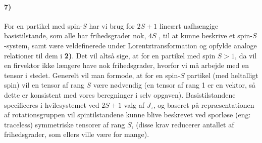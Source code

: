 \documentclass[../main.tex]{subfiles}
\begin{document}

\paragraph[7) Teori for spin-$S$ partikel med $S > 1$]{\textbf{7)}}

For en partikel med spin-$S$ har vi brug for $2S+1$ lineært uafhængige basistilstande, som alle har frihedsgrader nok, $4S$ \cite{DegreesOfFreedomSpin}, til at kunne beskrive et spin-$S$-system, samt være veldefinerede under Lorentztransformation og opfylde analoge relationer til dem i \textbf{2)}. Det vil altså sige, at for en partikel med spin $S > 1$, da vil en firvektor ikke længere have nok frihedsgrader, hvorfor vi må arbejde med en tensor i stedet. Generelt vil man formode, at for en spin-$S$ partikel (med heltalligt spin) vil en tensor af rang $S$ være nødvendig (en tensor af rang 1 er en vektor, så dette er konsistent med vores beregninger i selv opgaven). Basistilstandene specificeres i hvilesystemet ved $2S+1$ valg af $J_z$, og baseret på repræsentationen af rotationsgruppen vil spintilstandene kunne blive beskrevet ved sporløse (eng: traceless) symmetriske tensorer af rang $S$, (disse krav reducerer antallet af frihedsgrader, som ellers ville være for mange).


\end{document}
